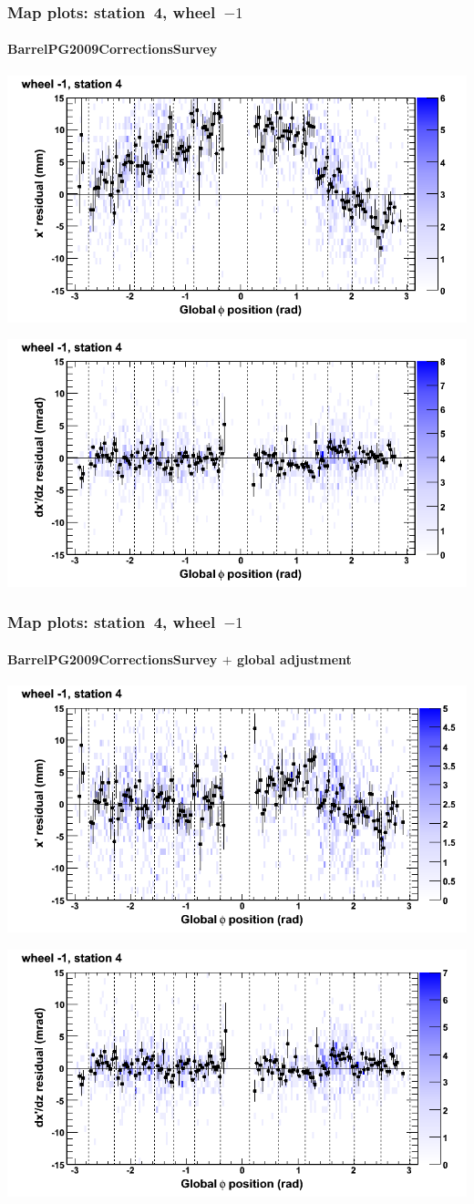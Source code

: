 \documentclass[compress]{beamer}
\begin{document}
\begin{frame}
\frametitle{Map plots: station~4, wheel~$-1$}
\framesubtitle{BarrelPG2009CorrectionsSurvey}
\includegraphics[width=0.5\linewidth]{mapplots_01/DTvsphi_st4whB_x.png}

\includegraphics[width=0.5\linewidth]{mapplots_01/DTvsphi_st4whB_dxdz.png}
\end{frame}
\begin{frame}
\frametitle{Map plots: station~4, wheel~$-1$}
\framesubtitle{BarrelPG2009CorrectionsSurvey $+$ global adjustment}
\includegraphics[width=0.5\linewidth]{mapplots_re01/DTvsphi_st4whB_x.png}

\includegraphics[width=0.5\linewidth]{mapplots_re01/DTvsphi_st4whB_dxdz.png}
\end{frame}
\end{document}
